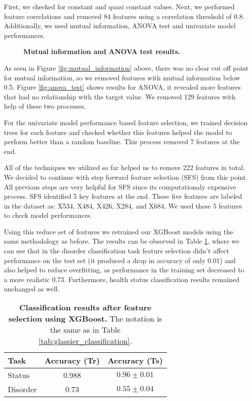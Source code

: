 \documentclass[fleqn,moreauthors,10pt]{ds_report}
\begin{document}
First, we checked for constant and quasi constant values. Next, we performed feature correlations and removed 84 features using a correlation threshold of 0.8. Additionally, we used mutual information, ANOVA test and univariate model performances.

\begin{figure}[htbp]
    \centering
    \subfloat[]{
        
        \label{fig:mutual_information}
    }
    \subfloat[]{
        
        \label{fig:anova_test}
    }
    \caption{\textbf{Mutual information and ANOVA test results.}}
    \label{fig:joint_dist_grid}
\end{figure}
As seen in Figure \ref{fig:mutual_information} above, there was no clear cut off point for mutual information, so we removed features with mutual information below 0.5. Figure \ref{fig:anova_test} shows results for ANOVA, it revealed more features that had no relationship with the target value. We removed 129 features with help of these two processes.

For the univariate model performance based feature selection, we trained decision trees for each feature and checked whether this features helped the model to perform better than a random baseline. This process removed 7 features at the end.

All of the techniques we utilized so far helped us to remove 222 features in total. We decided to continue with step forward feature selection (SFS) from this point. All previous steps are very helpful for SFS since its computationaly expensive process. SFS identified 5 key features at the end. These five features are labeled in the dataset as: X534, X484, X426, X284, and X684. We used these 5 features to check model performances.

Using this reduce set of features we retrained our XGBoost models using the same methodology as before. The results can be observed in Table \ref{tab:feature_selection_results}, where we can see that in the disorder classification task feature selection didn't affect performance on the test set (it produced a drop in accuracy of only 0.01) and also helped to reduce overfitting, as performance in the training set decreased to a more realistic 0.73. Furthermore, health status classification results remained unchanged as well.

\begin{table}[h!]
\centering
\begin{tabular}{|l|c|c|}
\hline
\textbf{Task} & \textbf{Accuracy (Tr)} & \textbf{Accuracy (Ts)}\\ \hline
Status & 0.988 &  $0.96 \pm 0.01$ \\ \hline
Disorder & 0.73 & $0.55 \pm 0.04$ \\ \hline
\end{tabular}
\caption{\textbf{Classification results after feature selection using XGBoost.} The notation is the same as in Table \ref{tab:glassier_classification}.}
\label{tab:feature_selection_results}
\end{table}
\end{document}
